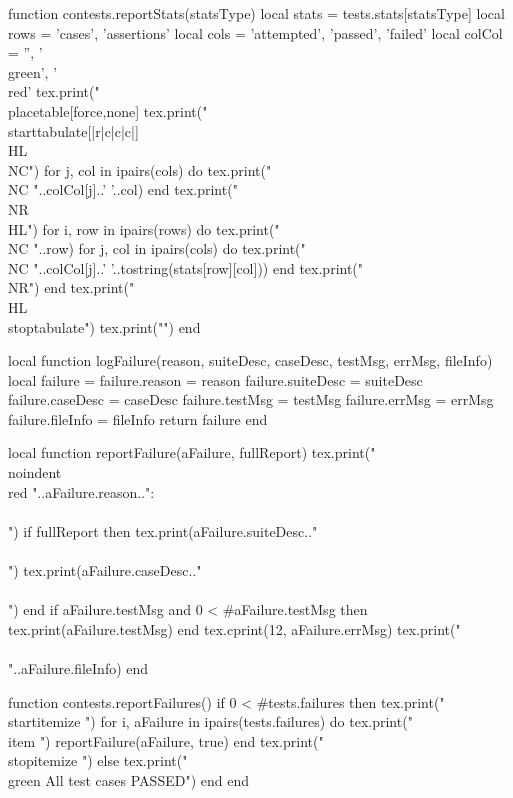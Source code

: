 function contests.reportStats(statsType)
  local stats = tests.stats[statsType]
  local rows = { 'cases', 'assertions' }
  local cols = { 'attempted', 'passed', 'failed' }
  local colCol = { '', '\\green', '\\red'}
  tex.print("\\placetable[force,none]{}{%
  tex.print("\\starttabulate[|r|c|c|c|]\\HL\\NC")
  for j, col in ipairs(cols) do
    tex.print("\\NC "..colCol[j]..' '..col)
  end
  tex.print("\\NR\\HL")
  for i, row in ipairs(rows) do
    tex.print("\\NC "..row)
    for j, col in ipairs(cols) do
      tex.print("\\NC "..colCol[j]..' '..tostring(stats[row][col]))
    end
    tex.print("\\NR")
  end
  tex.print("\\HL\\stoptabulate")
  tex.print("}")
end

local function logFailure(reason, suiteDesc, caseDesc,
                          testMsg, errMsg, fileInfo)
  local failure = {}
  failure.reason    = reason
  failure.suiteDesc = suiteDesc
  failure.caseDesc  = caseDesc
  failure.testMsg   = testMsg
  failure.errMsg    = errMsg
  failure.fileInfo  = fileInfo
  return failure
end

local function reportFailure(aFailure, fullReport)
  tex.print("\\noindent{\\red "..aFailure.reason.."}:\\\\")
  if fullReport then
    tex.print(aFailure.suiteDesc.."\\\\")
    tex.print(aFailure.caseDesc.."\\\\")
  end
  if aFailure.testMsg and 0 < #aFailure.testMsg then
    tex.print(aFailure.testMsg)
  end
  tex.cprint(12, aFailure.errMsg)
  tex.print("\\\\"..aFailure.fileInfo)
end

function contests.reportFailures()
  if 0 < #tests.failures then
    tex.print("\\startitemize ")
    for i, aFailure in ipairs(tests.failures) do
      tex.print("\\item ")
      reportFailure(aFailure, true)
    end
    tex.print("\\stopitemize ")
  else
    tex.print("{\\green All test cases PASSED}")
  end
end

\stopLuaCode

\stopchapter